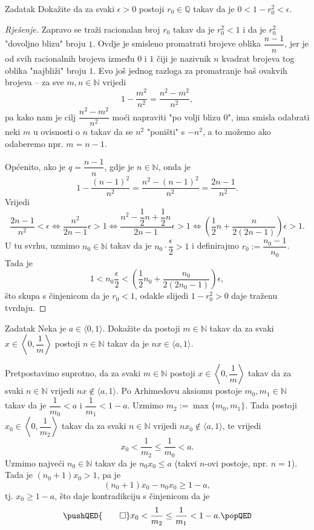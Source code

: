 \begin{exercise}{Zadatak}
\label{archimedes2}
Dokažite da za svaki $\epsilon>0$ postoji $r_0\in \mathbb{Q}$ takav da je $0<1-r_0^2<\epsilon$.
\end{exercise}
\begin{proof}[Rješenje]
Zapravo se traži racionalan broj $r_0$ takav da je $r_0^2<1$ i da je $r_0^2$ "dovoljno blizu" broju $1$. Ovdje je smisleno promatrati brojeve oblika $\dfrac{n-1}{n}$, jer je od svih racionalnih brojeva između $0$ i $1$ čiji je nazivnik $n$ kvadrat brojeva tog oblika "najbliži" broju $1$. Evo još jednog razloga za promatranje baš ovakvih brojeva -- za sve $m, n\in \mathbb{N}$ vrijedi
$$1-\dfrac{m^2}{n^2}=\dfrac{n^2-m^2}{n^2},$$
pa kako nam je cilj $\dfrac{n^2-m^2}{n^2}$ moći napraviti "po volji blizu $0$", ima smisla odabrati neki $m$ u ovisnosti o $n$ takav da se $n^2$ "poništi" s $-n^2$, a to možemo ako odaberemo npr. $m=n-1$.

Općenito, ako je $q=\dfrac{n-1}{n}$, gdje je $n\in \mathbb{N}$, onda je 
$$1-\dfrac{(n-1)^2}{n^2}=\dfrac{n^2-(n-1)^2}{n^2}=\dfrac{2n-1}{n^2}.$$
Vrijedi $$\dfrac{2n-1}{n^2}<\epsilon\Leftrightarrow \dfrac{n^2}{2n-1}\epsilon>1\Leftrightarrow \dfrac{n^2-\dfrac{1}{2}n+\dfrac{1}{2}n}{2n-1}\epsilon>1\Leftrightarrow \left(\dfrac{1}{2}n+\dfrac{n}{2(2n-1)}\right)\epsilon>1.$$
U tu svrhu, uzmimo $n_0\in \mathbb{N}$ takav da je $n_0\cdot\dfrac{\epsilon}{2}>1$ i definirajmo $r_0:=\dfrac{n_0-1}{n_0}$. Tada je
$$1<n_0\dfrac{\epsilon}{2}<\left(\dfrac{1}{2}n_0+\dfrac{n_0}{2(2n_0-1)}\right)\epsilon,$$
što skupa s činjenicom da je $r_0<1$, odakle slijedi $1-r_0^2>0$ daje traženu tvrdnju.
\end{proof}
\begin{exercise}{Zadatak}
\label{lemmaforalimitpointexercise}
Neka je $a\in \langle 0, 1\rangle$. Dokažite da postoji $m\in \mathbb{N}$ takav da za svaki $x\in \left\langle 0, \dfrac{1}{m}\right\rangle$ postoji $n\in \mathbb{N}$ takav da je $nx\in \langle a, 1\rangle$.
\end{exercise}
\begin{proof*}
Pretpostavimo suprotno, da za svaki $m\in \mathbb{N}$ postoji $x\in \left\langle 0, \dfrac{1}{m}\right\rangle$ takav da za svaki $n\in \mathbb{N}$ vrijedi $nx\notin \langle a, 1\rangle$. Po Arhimedovu aksiomu postoje $m_0, m_1\in \mathbb{N}$ takav da je $\dfrac{1}{m_0}<a$ i $\dfrac{1}{m_1}<1-a$. Uzmimo $m_2:=\max{\{m_0, m_1\}}$. Tada postoji $x_0\in \left\langle 0, \dfrac{1}{m_2}\right\rangle$ takav da za svaki $n\in \mathbb{N}$ vrijedi $nx_0\notin \langle a, 1\rangle$, te vrijedi
$$x_0<\dfrac{1}{m_2}\leq \dfrac{1}{m_0}<a.$$
Uzmimo najveći $n_0\in \mathbb{N}$ takav da je $n_0x_0\leq a$ (takvi $n$-ovi postoje, npr. $n=1$). Tada je $(n_0+1)x_0>1$, pa je $$(n_0+1)x_0-n_0x_0\geq 1-a,$$ tj. $x_0\geq 1-a$, što daje kontradikciju s činjenicom da je
\[\pushQED{\qed}
x_0<\dfrac{1}{m_2}\leq\dfrac{1}{m_1}<1-a. \qedhere
\popQED
\]
\end{proof*}
